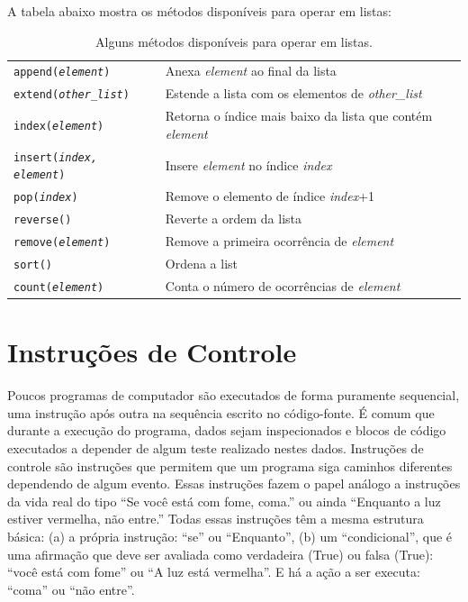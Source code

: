 A tabela abaixo mostra os métodos disponíveis para operar em listas:
\begin{table}[h!]
    \centering
    \begin{tabular}{l l}
    {\tt append({\it element})}     & Anexa {\it element} ao final da lista  \\
    {\tt extend({\it other\_list})}     &  Estende a lista com os elementos de {\it other\_list}\\
    {\tt index({\it element})} & Retorna o índice mais baixo da lista que contém {\it element} \\
    {\tt insert({\it index, element})} & Insere {\it element} no índice {\it index} \\
    {\tt pop({\it index})} & Remove o elemento de índice {\it index}+1\\
    {\tt reverse()} & Reverte a ordem da lista\\
    {\tt remove({\it element})} & Remove a primeira ocorrência de {\it element}\\
    {\tt sort()} & Ordena a list\\
    {\tt count({\it element})} & Conta o número de ocorrências de {\it element}
    \end{tabular}
    \caption{Alguns métodos disponíveis para operar em listas.}
    \label{tb:list-methods}
\end{table}

\section{Instruções de Controle}

Poucos programas de computador são executados de forma puramente sequencial, uma instrução após outra na sequência escrito no código-fonte. É comum que durante a execução do programa, dados sejam inspecionados e blocos de código executados a depender de
algum teste realizado nestes dados. Instruções de controle são instruções que permitem que um programa siga caminhos diferentes dependendo de algum evento. Essas instruções fazem o papel análogo a instruções da vida real do tipo “Se você está com fome, coma.” ou ainda “Enquanto a luz estiver vermelha, não entre.”  Todas essas instruções têm a mesma estrutura básica: (a) a própria instrução: ``se'' ou ``Enquanto'', (b) um  ``condicional'', que é uma afirmação que deve ser avaliada como verdadeira (True) ou falsa (True): ``você está com fome'' ou ``A luz está vermelha''. E há a ação a ser executa: ``coma'' ou ``não entre''. 

